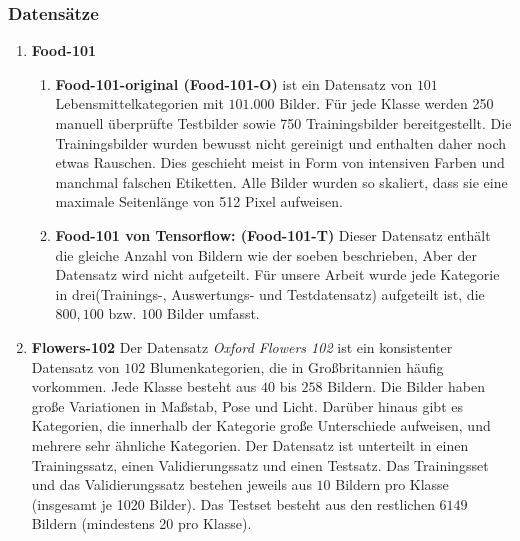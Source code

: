 \documentclass[12pt,a4paper]{scrartcl}
\numberwithin{equation}{section}
\begin{document}
\subsubsection{Datensätze}
\begin{enumerate}
	\item\textbf{ Food-101}\cite{food-101-original}
	\begin{enumerate}
		\item \textbf{ Food-101-original (Food-101-O)} ist ein Datensatz von $ 101 $ Lebensmittelkategorien mit $ 101.000 $ Bilder. Für jede Klasse werden 250 manuell überprüfte Testbilder sowie 750 Trainingsbilder bereitgestellt. Die Trainingsbilder wurden bewusst nicht gereinigt und enthalten daher noch etwas Rauschen. Dies geschieht meist in Form von intensiven Farben und manchmal falschen Etiketten. Alle Bilder wurden so skaliert, dass sie eine maximale Seitenlänge von 512 Pixel aufweisen.
	  	\item\textbf{ Food-101 von Tensorflow: (Food-101-T)} Dieser Datensatz enthält die gleiche Anzahl von Bildern wie der soeben beschrieben, Aber der Datensatz wird nicht aufgeteilt. Für unsere Arbeit wurde jede Kategorie in drei(Trainings-, Auswertungs- und Testdatensatz) aufgeteilt ist, die $ 800, 100 $ bzw. $ 100 $ Bilder umfasst.
	\end{enumerate}
	\item \textbf{Flowers-102}
			Der Datensatz \textit{Oxford Flowers 102} ist ein konsistenter Datensatz von $ 102 $ Blumenkategorien, die in Großbritannien häufig vorkommen. Jede Klasse besteht aus $ 40 $ bis $ 258 $ Bildern. Die Bilder haben große Variationen in Maßstab, Pose und Licht. Darüber hinaus gibt es Kategorien, die innerhalb der Kategorie große Unterschiede aufweisen, und mehrere sehr ähnliche Kategorien. Der Datensatz ist unterteilt in einen Trainingssatz, einen Validierungssatz und einen Testsatz. Das Trainingsset und das Validierungssatz bestehen jeweils aus $ 10 $ Bildern pro Klasse (insgesamt je 1020 Bilder). Das Testset besteht aus den restlichen $ 6149 $ Bildern (mindestens 20 pro Klasse).
\end{enumerate}
\end{document}

